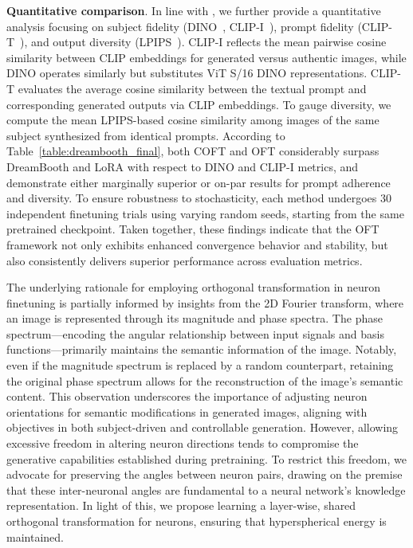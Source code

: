 \textbf{Quantitative comparison}. In line with \cite{ruiz2023dreambooth}, we further provide a quantitative analysis focusing on subject fidelity (DINO~\cite{caron2021emerging}, CLIP-I~\cite{radford2021learning}), prompt fidelity (CLIP-T~\cite{radford2021learning}), and output diversity (LPIPS~\cite{zhang2018unreasonable}). CLIP-I reflects the mean pairwise cosine similarity between CLIP embeddings for generated versus authentic images, while DINO operates similarly but substitutes ViT S/16 DINO representations. CLIP-T evaluates the average cosine similarity between the textual prompt and corresponding generated outputs via CLIP embeddings. To gauge diversity, we compute the mean LPIPS-based cosine similarity among images of the same subject synthesized from identical prompts. According to Table~\ref{table:dreambooth_final}, both COFT and OFT considerably surpass DreamBooth and LoRA with respect to DINO and CLIP-I metrics, and demonstrate either marginally superior or on-par results for prompt adherence and diversity. To ensure robustness to stochasticity, each method undergoes 30 independent finetuning trials using varying random seeds, starting from the same pretrained checkpoint. Taken together, these findings indicate that the OFT framework not only exhibits enhanced convergence behavior and stability, but also consistently delivers superior performance across evaluation metrics.

The underlying rationale for employing orthogonal transformation in neuron finetuning is partially informed by insights from the 2D Fourier transform, where an image is represented through its magnitude and phase spectra. The phase spectrum—encoding the angular relationship between input signals and basis functions—primarily maintains the semantic information of the image. Notably, even if the magnitude spectrum is replaced by a random counterpart, retaining the original phase spectrum allows for the reconstruction of the image's semantic content. This observation underscores the importance of adjusting neuron orientations for semantic modifications in generated images, aligning with objectives in both subject-driven and controllable generation. However, allowing excessive freedom in altering neuron directions tends to compromise the generative capabilities established during pretraining. To restrict this freedom, we advocate for preserving the angles between neuron pairs, drawing on the premise that these inter-neuronal angles are fundamental to a neural network's knowledge representation. In light of this, we propose learning a layer-wise, shared orthogonal transformation for neurons, ensuring that hyperspherical energy is maintained.

